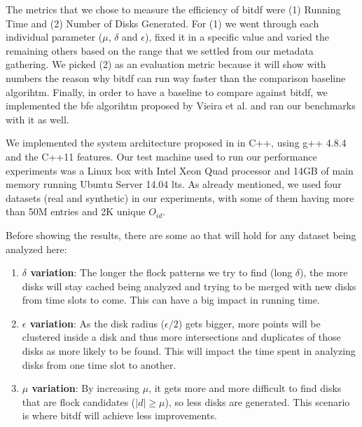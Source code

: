 {The metrics that we chose to measure the efficiency of \ac{bitdf} were (1) Running Time and (2) Number of Disks
Generated. For (1) we went through each individual parameter ($\mu$, $\delta$ and $\epsilon$), fixed it in a specific
value and varied the remaining others based on the range that we settled from our metadata gathering. We picked (2) as
an evaluation metric because it will show with numbers the reason why \ac{bitdf} can run way faster than the comparison
baseline algorihtm. Finally, in order to have a baseline to compare against \ac{bitdf}, we implemented the \ac{bfe}
algorihtm proposed by Vieira et al. \citep{vieira} and ran our benchmarks with it as well.

We implemented the system architecture proposed in  in C++, using g++ 4.8.4 and the C++11
\citep{cpp11spec} features. Our test machine used to run our performance experiments was a Linux box with Intel Xeon
Quad processor and 14GB of main memory running Ubuntu Server 14.04 \ac{lts}. As already mentioned, we used four datasets
(real and synthetic) in our experiments, with some of them having more than 50M entries and 2K unique $O_{id}$.

Before showing the results, there are some \ac{ao} that will hold for any dataset being analyzed here:

\begin{enumerate}
    \item \textbf{$\delta$ variation}: The longer the flock patterns we try to find (long $\delta$), the more disks will
        stay cached being analyzed and trying to be merged with new disks from time slots to come. This can have a big
        impact in running time.\label{sssec:lvariation}

    \item \textbf{$\epsilon$ variation}: As the disk radius ($\epsilon / 2$) gets bigger, more points will be clustered
        inside a disk and thus more intersections and duplicates of those disks as more likely to be found. This will
        impact the time spent in analyzing disks from one time slot to another.\label{sssec:gvariation}

    \item \textbf{$\mu$ variation}: By increasing $\mu$, it gets more and more difficult to find disks that are flock
        candidates ($|d| \ge \mu$), so less disks are generated. This scenario is where \ac{bitdf} will achieve less
        improvements. \label{sssec:nvariation}
\end{enumerate}

}
